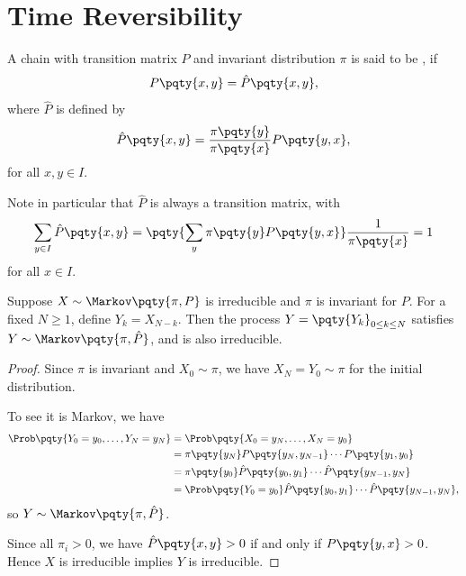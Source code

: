 \section{Time Reversibility}

\begin{definition}[Reversibility]
    A chain with transition matrix \(P\) and invariant distribution \(\pi\) is said to be , if
    \[
        P\pqty{x, y} = \hat{P}\pqty{x, y},
    \]
    where \(\hat{P}\) is defined by
    \[
        \hat{P}\pqty{x, y} = \frac{\pi\pqty{y}}{\pi\pqty{x}} P\pqty{y, x},
    \]
    for all \(x, y \in I\).
\end{definition}

Note in particular that \(\hat{P}\) is always a transition matrix, with
\[
    \sum_{y \in I} \hat{P}\pqty{x, y} = \pqty{\sum_y \pi\pqty{y} P\pqty{y, x}} \frac{1}{\pi\pqty{x}} = 1
\]
for all \(x \in I\).

\begin{theorem}
    Suppose \(X \sim \Markov\pqty{\pi, P}\) is irreducible and \(\pi\) is invariant for \(P\). For a fixed \(N \geq 1\), define \(Y_k = X_{N - k}\). Then the process \(Y = \pqty{Y_k}_{0 \leq k \leq N}\) satisfies \(Y \sim \Markov\pqty{\pi, \hat{P}}\), and is also irreducible.
\end{theorem}

\begin{proof}
    Since \(\pi\) is invariant and \(X_0 \sim \pi\), we have \(X_N = Y_0 \sim \pi\) for the initial distribution.

    To see it is Markov, we have
    \begin{align*}
        \Prob\pqty{Y_0 = y_0, \ldots, Y_N = y_N} &= \Prob\pqty{X_0 = y_N, \ldots, X_N = y_0} \\
        &= \pi\pqty{y_N} P\pqty{y_N, y_{N - 1}} \cdots P\pqty{y_1, y_0} \\
        &= \pi\pqty{y_0} \hat{P}\pqty{y_0, y_1} \cdots \hat{P}\pqty{y_{N - 1}, y_N} \\
        &= \Prob\pqty{Y_0 = y_0} \hat{P}\pqty{y_0, y_1} \cdots \hat{P}\pqty{y_{N - 1}, y_N},
    \end{align*}
    so \(Y \sim \Markov\pqty{\pi, \hat{P}}\).

    Since all \(\pi_i > 0\), we have \(\hat{P}\pqty{x, y} > 0\) if and only if \(P\pqty{y, x} > 0\). Hence \(X\) is irreducible implies \(Y\) is irreducible.
\end{proof}

